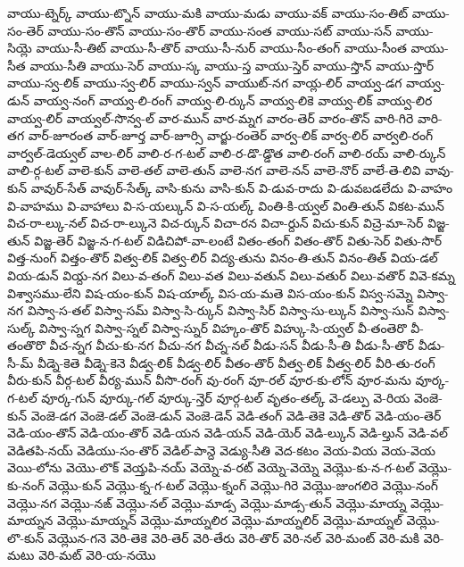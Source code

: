 {వాయు-ట్నెర్క్
వాయు-ట్నొన్
వాయు-మకి
వాయు-మడు
వాయు-వక్
వాయు-సం-తిట్
వాయు-సం-తెర్
వాయు-సం-తొన్
వాయు-సం-తొర్
వాయు-సంత
వాయు-సట్
వాయు-సన్
వాయు-సియ్లె
వాయు-సీ-తిట్
వాయు-సీ-తొర్
వాయు-సీ-నుర్
వాయు-సీం-తంగ్
వాయు-సీంత
వాయు-సీత
వాయు-సీతి
వాయు-సెర్
వాయు-స్క
వాయు-స్త
వాయు-స్తెర్
వాయు-స్తొన్
వాయు-స్తొర్
వాయు-స్వ-లిక్
వాయు-స్వ-లిర్
వాయు-స్వన్
వాయుట్-నగ
వాయ్ల-లిర్
వాయ్వ-డగ
వాయ్వ-డున్
వాయ్వ-నంగ్
వాయ్వ-లి-రంగ్
వాయ్వ-లి-ర్కున్
వాయ్వ-లికె
వాయ్వ-లిక్
వాయ్వ-లిర
వాయ్వ-లిర్
వాయ్వల్-సొన్వ-ల్
వార-మున్
వార-మ్నగ
వారం-తెర్
వారం-తొన్
వారి-గిరె
వారి-తగ
వార్-జూరంత
వార్-జూర్త
వార్-జూర్సి
వార్జు-రంతెర్
వార్వ-లిక్
వార్వ-లిర్
వార్వలి-రంగ్
వార్వల్-డెయ్వల్
వాల-లిర్
వాలి-ర-గ-టల్
వాలి-ర-డొ-డ్డొత
వాలి-రంగ్
వాలి-రయ్
వాలి-ర్కున్
వాలి-ర్గ-టల్
వాలె-కున్
వాలె-తల్
వాలె-తున్
వాలె-నగ
వాలె-నన్
వాలె-నొర్
వాలే-తె-లివి
వావు-కున్
వావుర్-సేత్
వావుర్-సేత్క్
వాసి-కును
వాసి-కున్
వి-డువ-రాదు
వి-డువబడలేదు
వి-వాహం
వి-వాహము
వి-వాహాలు
వి-స-యల్కున్
వి-స-యల్క్
వింతి-కి-య్వల్
వింతి-తున్
వికట-మున్
విచ-రా-ల్కు-నల్
విచ-రా-ల్కునె
విచ-ర్కున్
విచా-రన
విచా-ర్దున్
విచు-కున్
విచ్రె-మా-సెర్
విజ్జ-తున్
విజ్జ-తెర్
విజ్జ-న-గ-టల్
విడిచిపో-వా-లంటే
వితం-తంగ్
వితం-తొర్
వితు-సెర్
వితు-సొర్
విత్త-నుంగ్
విత్తం-తొర్
విత్వ-లిక్
విత్వ-లిర్
విద్య-తును
వినం-తి-తున్
వినం-తిత్
వియ-డల్
వియ-డున్
వియ్ద-నగ
విలు-వ-తంగ్
విలు-వత
విలు-వతున్
విలు-వతుర్
విలు-వతొర్
వివె-కమ్న
విశ్వాసము-లేని
విష-యం-కున్
విష-యాల్క్
విస-య-మతె
విస-యం-కున్
విస్వ-సమ్నె
విస్వా-నగ
విస్వా-స-తల్
విస్వా-సమ్
విస్వా-సి-ర్కున్
విస్వా-సిర్
విస్వా-సు-ల్కున్
విస్వా-సున్
విస్వా-సుల్క్
విస్వా-స్నగ
విస్వా-స్నల్
విస్వా-స్నుర్
విహ్కం-తొర్
విహ్కు-సి-య్వల్
వీ-తంతెరొ
వీ-తంతొరొ
వీచ-న్నగ
వీచు-కు-నగ
వీచు-నగ
వీచ్న-నల్
వీడు-సన్
వీడు-సీ-తి
వీడు-సీ-తొర్
వీడు-సీ-మ్
వీడ్నె-కెతె
వీడ్నె-కెనె
వీడ్వ-లిక్
వీడ్వ-లిర్
వీతం-తొర్
వీత్వ-లిక్
వీత్వ-లిర్
వీరి-తు-రంగ్
వీరు-కున్
వీర్గ-టల్
వీర్య-మున్
వీసొ-రంగ్
వు-రంగ్
వూ-రల్
వూర-కు-లోన్
వూర-మను
వూర్క-గ-టల్
వూర్క-గున్
వూర్కు-గల్
వూర్కు-న్తెర్
వూర్గ-టల్
వృతం-తల్క్
వె-డల్పు
వె-రియ
వెంజె-కున్
వెంజె-డగ
వెంజె-డల్
వెంజె-డున్
వెంజె-డెన్
వెడి-తంగ్
వెడి-తెకె
వెడి-తొర్
వెడి-యం-తెర్
వెడి-యం-తొన్
వెడి-యం-తొర్
వెడి-యన
వెడి-యన్
వెడి-యెర్
వెడి-ల్కున్
వెడి-ల్తున్
వెడి-వల్
వెడితపి-నయ్
వెడియు-సం-తొర్
వెడిల్-పాన్దె
వెడ్యు-సీతి
వెద-కటం
వెయ-వియ
వెయ-వెయ
వెయి-లోను
వెయొ-లొక్
వెయ్తపి-నయ్
వెయ్నె-వ-రట్
వెయ్నె-వెయ్నె
వెయ్లొ-కు-న-గ-టల్
వెయ్లొ-కు-నంగ్
వెయ్లొ-కున్
వెయ్లొ-క్న-గ-టల్
వెయ్లొ-క్నంగ్
వెయ్లొ-గిరె
వెయ్లొ-జుంగలిరె
వెయ్లొ-నంగ్
వెయ్లొ-నగ
వెయ్లొ-నఙ్
వెయ్లొ-నల్
వెయ్లొ-మాడ్స
వెయ్లొ-మాడ్స-తున్
వెయ్లొ-మాయ్న
వెయ్లొ-మాయ్నన
వెయ్లొ-మాయ్నన్
వెయ్లొ-మాయ్నలిర
వెయ్లొ-మాయ్నలిర్
వెయ్లొ-మాయ్నల్
వెయ్లొ-లొ-కున్
వెయ్లొన-గనె
వెరి-తెకె
వెరి-తెర్
వెరి-తేరు
వెరి-తొర్
వెరి-నల్
వెరి-మంట్
వెరి-మకి
వెరి-మటు
వెరి-మట్
వెరి-య-నయొ
}
